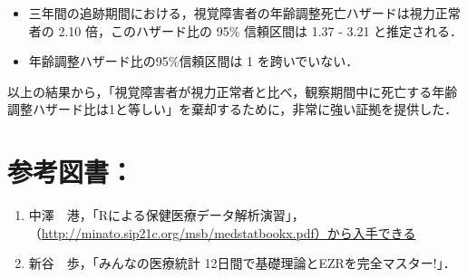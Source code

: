 \documentclass[11pt,]{problemset}
\providecommand{\tightlist}{%
  \setlength{\itemsep}{0pt}\setlength{\parskip}{0pt}}
\begin{document}
\begin{itemize}
\item
  三年間の追跡期間における，視覚障害者の年齢調整死亡ハザードは視力正常者の
  2.10 倍，このハザード比の 95\% 信頼区間は 1.37 - 3.21 と推定される．
\item
  年齢調整ハザード比の95\%信頼区間は 1 を跨いでいない．
\end{itemize}

以上の結果から，「視覚障害者が視力正常者と比べ，観察期間中に死亡する年齢調整ハザード比は1と等しい」を棄却するために，非常に強い証拠を提供した．

\section{参考図書：}

\begin{enumerate}
\def\labelenumi{\arabic{enumi}.}
\tightlist
\item
  中澤　港，「Rによる保健医療データ解析演習」，\newline（\url{http://minato.sip21c.org/msb/medstatbookx.pdf）から入手できる}
\item
  新谷　歩，「みんなの医療統計 12日間で基礎理論とEZRを完全マスター!」．
\end{enumerate}
\end{document}
